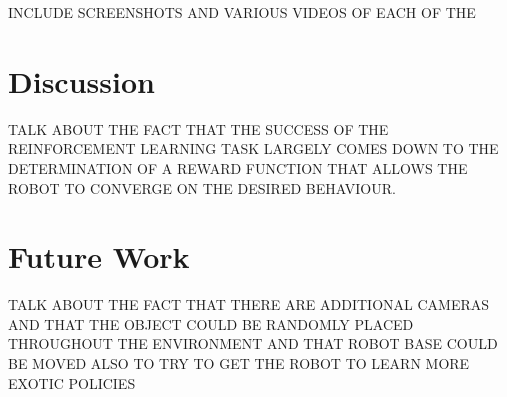 \documentclass[a4paper]{article}
\begin{document}
INCLUDE SCREENSHOTS AND VARIOUS VIDEOS OF EACH OF THE 


\section{Discussion}
TALK ABOUT THE FACT THAT THE SUCCESS OF THE REINFORCEMENT LEARNING TASK LARGELY COMES DOWN TO THE DETERMINATION OF A REWARD FUNCTION THAT ALLOWS THE ROBOT TO CONVERGE ON THE DESIRED BEHAVIOUR.

\section{Future Work}
TALK ABOUT THE FACT THAT THERE ARE ADDITIONAL CAMERAS AND THAT THE OBJECT COULD BE RANDOMLY PLACED THROUGHOUT THE ENVIRONMENT AND THAT ROBOT BASE COULD BE MOVED ALSO TO TRY TO GET THE ROBOT TO LEARN MORE EXOTIC POLICIES



\end{document}
